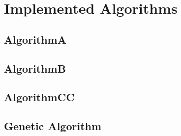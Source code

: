 \chapter{Implemented Algorithms}
\label{cha:implementedAlgorithms}

\section{AlgorithmA}
\label{cha:oppMarcinLis}

\section{AlgorithmB}
\label{cha:oppMarcinLis}

\section{AlgorithmCC}
\label{cha:oppMarcinLis}

\section{Genetic Algorithm}
\label{cha:oppMarcinLis}